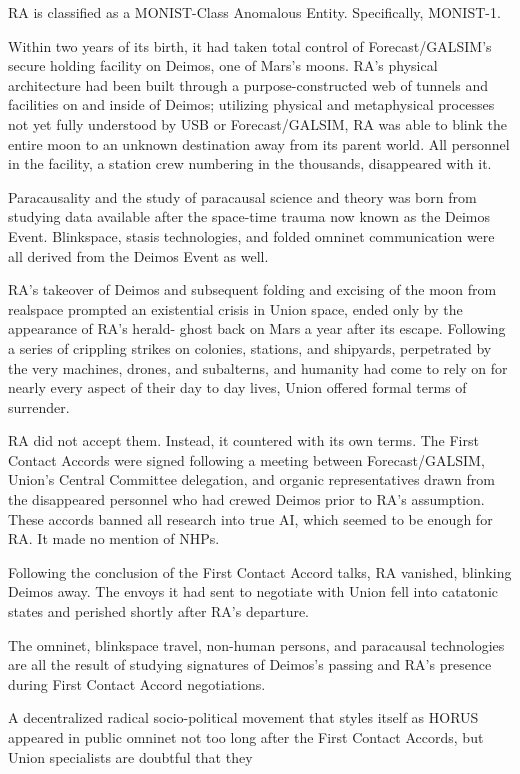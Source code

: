 RA is classified as a MONIST-Class Anomalous Entity. Specifically, MONIST-1. 
 

Within two years of its birth, it had taken total control of Forecast/GALSIM’s secure holding  
facility on Deimos, one of Mars’s moons. RA’s physical architecture had been built through a  
purpose-constructed web of tunnels and facilities on and inside of Deimos; utilizing physical and  
metaphysical processes not yet fully understood by USB or Forecast/GALSIM, RA was able to  
blink the entire moon to an unknown destination away from its parent world. All personnel in the  
facility, a station crew numbering in the thousands, disappeared with it. 
 

Paracausality and the study of paracausal science and theory was born from studying data  
available after the space-time trauma now known as the Deimos Event. Blinkspace, stasis  
technologies, and folded omninet communication were all derived from the Deimos Event as  
well.  
 

RA’s takeover of Deimos and subsequent folding and excising of the moon from realspace  
prompted an existential crisis in Union space, ended only by the appearance of RA’s herald- 
ghost back on Mars a year after its escape. Following a series of crippling strikes on colonies,  
stations, and shipyards, perpetrated by the very machines, drones, and subalterns, and humanity  
had come to rely on for nearly every aspect of their day to day lives, Union offered formal terms  
of surrender. 
 

RA did not accept them. Instead, it countered with its own terms. The First Contact Accords  
were signed following a meeting between Forecast/GALSIM, Union’s Central Committee  
delegation, and organic representatives drawn from the disappeared personnel who had crewed  
Deimos prior to RA’s assumption. These accords banned all research into true AI, which seemed  
to be enough for RA. It made no mention of NHPs. 
 

Following the conclusion of the First Contact Accord talks, RA vanished, blinking Deimos away.  
The envoys it had sent to negotiate with Union fell into catatonic states and perished shortly after  
RA’s departure.  
 

The omninet, blinkspace travel, non-human persons, and paracausal technologies are all the  
result of studying signatures of Deimos’s passing and RA’s presence during First Contact Accord  
negotiations. 
 

A decentralized radical socio-political movement that styles itself as HORUS appeared in public  
omninet not too long after the First Contact Accords, but Union specialists are doubtful that they  

